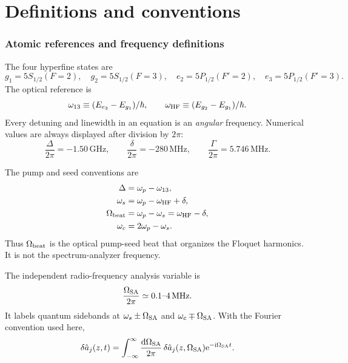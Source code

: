 \documentclass[11pt,a4paper]{article}
\newcommand{\dd}{\mathrm d}
\newcommand{\ii}{\mathrm i}
\newcommand{\e}{\mathrm e}
\newcommand{\GHz}{\,\mathrm{GHz}}
\newcommand{\MHz}{\,\mathrm{MHz}}
\begin{document}
\tableofcontents
\clearpage

\part{Definitions and conventions}

\section{Atomic references and frequency definitions}

The four hyperfine states are
\[
g_1=5S_{1/2}(F=2),\quad g_2=5S_{1/2}(F=3),\quad
e_2=5P_{1/2}(F'=2),\quad e_3=5P_{1/2}(F'=3).
\]
The optical reference is
\[
\omega_{13}\equiv(E_{e_3}-E_{g_1})/\hbar,\qquad
\omega_{\rm HF}\equiv(E_{g_2}-E_{g_1})/\hbar .
\]
Every detuning and linewidth in an equation is an \emph{angular} frequency.
Numerical values are always displayed after division by $2\pi$:
\[
\frac{\Delta}{2\pi}=-1.50\GHz,\qquad
\frac{\delta}{2\pi}=-280\MHz,\qquad
\frac{\Gamma}{2\pi}=5.746\MHz .
\]

The pump and seed conventions are
\begin{align}
\Delta&=\omega_p-\omega_{13},\\
\omega_s&=\omega_p-\omega_{\rm HF}+\delta,\\
\Omega_{\rm beat}&=\omega_p-\omega_s=\omega_{\rm HF}-\delta,\\
\omega_c&=2\omega_p-\omega_s .
\label{eq:frequency-definitions}
\end{align}
Thus $\Omega_{\rm beat}$ is the optical pump-seed beat that organizes the
Floquet harmonics. It is not the spectrum-analyzer frequency.

The independent radio-frequency analysis variable is
\[
\frac{\Omega_{\rm SA}}{2\pi}\simeq0.1\text{--}4\MHz .
\]
It labels quantum sidebands at $\omega_s\pm\Omega_{\rm SA}$ and
$\omega_c\mp\Omega_{\rm SA}$. With the Fourier convention used here,
\begin{equation}
\delta\hat a_j(z,t)=
\int_{-\infty}^{\infty}\frac{\dd\Omega_{\rm SA}}{2\pi}\,
\delta\hat a_j(z,\Omega_{\rm SA})\e^{-\ii\Omega_{\rm SA}t}.
\label{eq:fourier}
\end{equation}
\end{document}
